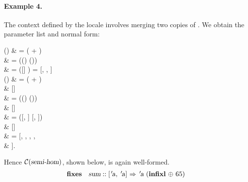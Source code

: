 \begin{isabellebody}
\begin{isamarkuptext}
\paragraph{Example 4.}
  The context defined by the locale  involves
  merging two copies of .  We obtain the parameter
  list and normal form:
\begin{align*%
}
  \pi() & = \pi( +
       )  \\
     & = (\pi() \App \pi())
        \\
     & = ([] ) 
     = [, , ] \\
  \N() & =
       \N( + ) \App \\
     & \phantom{==}
       [] \\
     & = (\N() \App \N()) \App \\
     & \phantom{==}
       [] \\
     & = ([, ] \App %
       [, ]) \App \\
     & \phantom{==}
       [] \\
     & = [, ,
       , , \\
     & \phantom{==}
       ].
\end{align*%
}
  Hence $\mathcal{C}(\emph{\sl semi{\mbox{-}}hom})$, shown below, is again well-formed.
\[
\begin{array}{ll}
  \textbf{fixes} & \isa{sum} :: \isa{{\isachardoublequote}{\isacharbrackleft}{\isacharprime}a{\isacharcomma}\ {\isacharprime}a{\isacharbrackright}\ {\isasymRightarrow}\ {\isacharprime}a{\isachardoublequote}}
    ~(\textbf{infixl}~\isa{{\isachardoublequote}{\isasymoplus}{\isachardoublequote}}~65) \\

\end{array}\]
\end{isamarkuptext}
\end{isabellebody}
